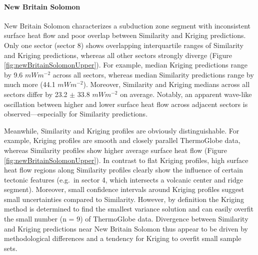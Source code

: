 \hypertarget{new-britain-solomon}{%
\paragraph{New Britain Solomon}\label{new-britain-solomon}}

New Britain Solomon characterizes a subduction zone segment with inconsistent surface heat flow and poor overlap between Similarity and Kriging predictions. Only one sector (sector 8) shows overlapping interquartile ranges of Similarity and Kriging predictions, whereas all other sectors strongly diverge (Figure \ref{fig:newBritainSolomonUpper}). For example, median Kriging predictions range by 9.6 \(mWm^{-2}\) across all sectors, whereas median Similarity predictions range by much more (44.1 \(mWm^{-2}\)). Moreover, Similarity and Kriging medians across all sectors differ by 23.2 \(\pm\) 33.8 \(mWm^{-2}\) on average. Notably, an apparent wave-like oscillation between higher and lower surface heat flow across adjacent sectors is observed---especially for Similarity predictions.

Meanwhile, Similarity and Kriging profiles are obviously distinguishable. For example, Kriging profiles are smooth and closely parallel ThermoGlobe data, whereas Similarity profiles show higher average surface heat flow (Figure \ref{fig:newBritainSolomonUpper}). In contrast to flat Kriging profiles, high surface heat flow regions along Similarity profiles clearly show the influence of certain tectonic features (e.g.~in sector 4, which intersects a volcanic center and ridge segment). Moreover, small confidence intervals around Kriging profiles suggest small uncertainties compared to Similarity. However, by definition the Kriging method is determined to find the smallest variance solution and can easily overfit the small number (n = 9) of ThermoGlobe data. Divergence between Similarity and Kriging predictions near New Britain Solomon thus appear to be driven by methodological differences and a tendency for Kriging to overfit small sample sets.




